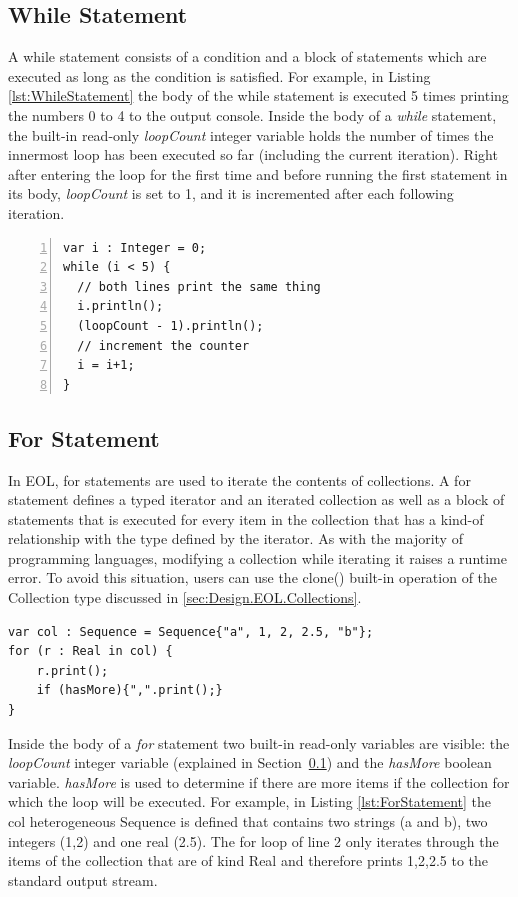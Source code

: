 \subsection{While Statement}
\label{sec:while-statement}

A while statement consists of a condition and a block of statements which are executed as long as the condition is satisfied. For example, in Listing \ref{lst:WhileStatement} the body of the while statement is executed 5 times printing the numbers 0 to 4 to the output console. Inside the body of a \emph{while} statement, the built-in read-only \emph{loopCount} integer variable holds the number of times the innermost loop has been executed so far (including the current iteration). Right after entering the loop for the first time and before running the first statement in its body, \emph{loopCount} is set to 1, and it is incremented after each following iteration.

\begin{lstlisting}[float=h, caption=Example of a while statement, label=lst:WhileStatement, numbers=left, language=EOL]
var i : Integer = 0;
while (i < 5) {
  // both lines print the same thing
  i.println();
  (loopCount - 1).println();
  // increment the counter
  i = i+1;
}
\end{lstlisting}

\subsection{For Statement}

In EOL, for statements are used to iterate the contents of collections. A for statement defines a typed iterator and an iterated collection as well as a block of statements that is executed for every item in the collection that has a kind-of relationship with the type defined by the iterator. As with the majority of programming languages, modifying a collection while iterating it raises a runtime error. To avoid this situation, users can use the clone() built-in operation of the Collection type discussed in \ref{sec:Design.EOL.Collections}. 

\begin{lstlisting}[float=h, caption=Example of a for statement, label=lst:ForStatement, language=EOL]
var col : Sequence = Sequence{"a", 1, 2, 2.5, "b"};
for (r : Real in col) {
	r.print();
	if (hasMore){",".print();}
}
\end{lstlisting}

Inside the body of a \emph{for} statement two built-in read-only variables are visible: the \emph{loopCount} integer variable (explained in Section~\ref{sec:while-statement}) and the \emph{hasMore} boolean variable. \emph{hasMore} is used to determine if there are more items if the collection for which the loop will be executed. For example, in Listing \ref{lst:ForStatement} the col heterogeneous Sequence is defined that contains two strings (a and b), two integers (1,2) and one real (2.5). The for loop of line 2 only iterates through the items of the collection that are of kind Real and therefore prints 1,2,2.5 to the standard output stream.

